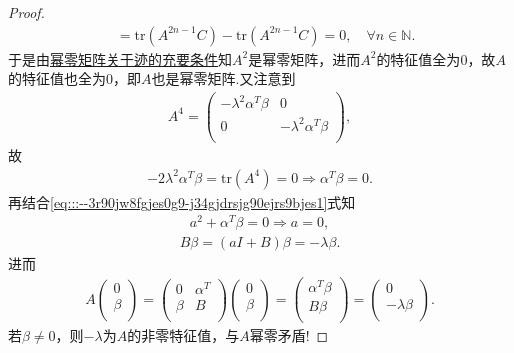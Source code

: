 \documentclass[../../main.tex]{subfiles}%
\begin{document}
\begin{proof}
\begin{align*}
&=\mathrm{tr}\left( A^{2n-1}C \right) -\mathrm{tr}\left( A^{2n-1}C \right) =0,\quad \forall n\in \mathbb{N}.
\end{align*}
于是由\hyperref[theorem:幂零矩阵关于迹的充要条件]{幂零矩阵关于迹的充要条件}知$A^2$是幂零矩阵，进而$A^2$的特征值全为$0$，故$A$的特征值也全为$0$，即$A$也是幂零矩阵.又注意到
\begin{align*}
A^4=\left( \begin{matrix}
-\lambda ^2\alpha ^T\beta&		0\\
0&		-\lambda ^2\alpha ^T\beta\\
\end{matrix} \right),
\end{align*}
故
\begin{align*}
-2\lambda ^2\alpha ^T\beta =\mathrm{tr}\left( A^4 \right) =0\Longrightarrow \alpha ^T\beta =0.
\end{align*}
再结合\eqref{eq:::--3r90jw8fgjes0g9-j34gjdrsjg90ejrs9bjes1}式知
\begin{align*}
a^2+\alpha ^T\beta =0\Longrightarrow a=0,
\end{align*}
\begin{align*}
B\beta =\left( aI+B \right) \beta =-\lambda \beta.
\end{align*}
进而
\begin{align*}
A\left( \begin{array}{c}
0\\
\beta\\
\end{array} \right) =\left( \begin{matrix}
0&		\alpha ^T\\
\beta&		B\\
\end{matrix} \right) \left( \begin{array}{c}
0\\
\beta\\
\end{array} \right) =\left( \begin{array}{c}
\alpha ^T\beta\\
B\beta\\
\end{array} \right) =\left( \begin{array}{c}
0\\
-\lambda \beta\\
\end{array} \right).
\end{align*}
若$\beta \ne 0$，则$-\lambda $为$A$的非零特征值，与$A$幂零矛盾!


\end{proof}
\end{document}
